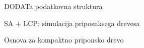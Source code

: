 DODATa podatkovna struktura

SA + LCP: simulacija priposnksega drevesa

Osnova za kompaktno priponsko drevo